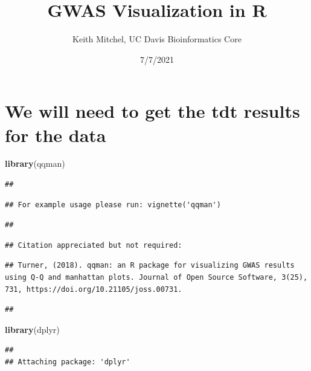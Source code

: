 \documentclass[
]{article}
\title{GWAS Visualization in R}
\author{Keith Mitchel, UC Davis Bioinformatics Core}
\date{7/7/2021}
\newenvironment{Shaded}{\begin{snugshade}}{\end{snugshade}}
\newcommand{\KeywordTok}[1]{\textcolor[rgb]{0.13,0.29,0.53}{\textbf{#1}}}
\newcommand{\NormalTok}[1]{#1}
\begin{document}
\maketitle

{
\setcounter{tocdepth}{2}
\tableofcontents
}
\hypertarget{we-will-need-to-get-the-tdt-results-for-the-data}{%
\section{We will need to get the tdt results for the
data}\label{we-will-need-to-get-the-tdt-results-for-the-data}}

\begin{Shaded}
\begin{Highlighting}[]
\KeywordTok{library}\NormalTok{(qqman)}
\end{Highlighting}
\end{Shaded}

\begin{verbatim}
## 
\end{verbatim}

\begin{verbatim}
## For example usage please run: vignette('qqman')
\end{verbatim}

\begin{verbatim}
## 
\end{verbatim}

\begin{verbatim}
## Citation appreciated but not required:
\end{verbatim}

\begin{verbatim}
## Turner, (2018). qqman: an R package for visualizing GWAS results using Q-Q and manhattan plots. Journal of Open Source Software, 3(25), 731, https://doi.org/10.21105/joss.00731.
\end{verbatim}

\begin{verbatim}
## 
\end{verbatim}

\begin{Shaded}
\begin{Highlighting}[]
\KeywordTok{library}\NormalTok{(dplyr)}
\end{Highlighting}
\end{Shaded}

\begin{verbatim}
## 
## Attaching package: 'dplyr'
\end{verbatim}
\end{document}

